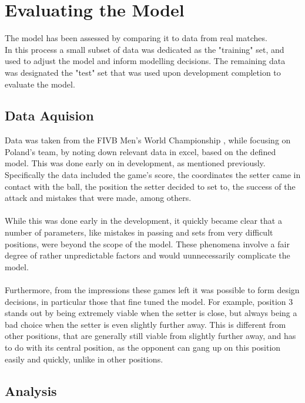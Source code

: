 \documentclass[main.tex]{subfiles}
\begin{document}
  \section{Evaluating the Model}
      
      The model has been assessed by comparing it to data from real matches. \\
      In this process a small subset of data was dedicated as the "training" set, and used to adjust the model and inform modelling decisions. The remaining data was designated the "test" set that was used upon development completion to evaluate the model.
      
      \subsection{Data Aquision}
        
        Data was taken from the FIVB Men's World Championship \cite{dataGames}, while focusing on Poland's team, by noting down relevant data in excel, based on the defined model. This was done early on in development, as mentioned previously. Specifically the data included the game's score, the coordinates the setter came in contact with the ball, the position the setter decided to set to, the success of the attack and mistakes that were made, among others.
        \\\\
        While this was done early in the development, it quickly became clear that a number of parameters, like mistakes in passing and sets from very difficult positions, were beyond the scope of the model. These phenomena involve a fair degree of rather unpredictable factors and would uunnecessarily complicate the model.
        \\\\
        Furthermore, from the impressions these games left it was possible to form design decisions, in particular those that fine tuned the model. For example, position 3 stands out by being extremely viable when the setter is close, but always being a bad choice when the setter is even slightly further away. This is different from other positions, that are generally still viable from slightly further away, and has to do with its central position, as the opponent can gang up on this position easily and quickly, unlike in other positions.\\
        
      \subsection{Analysis}
        
\end{document}
